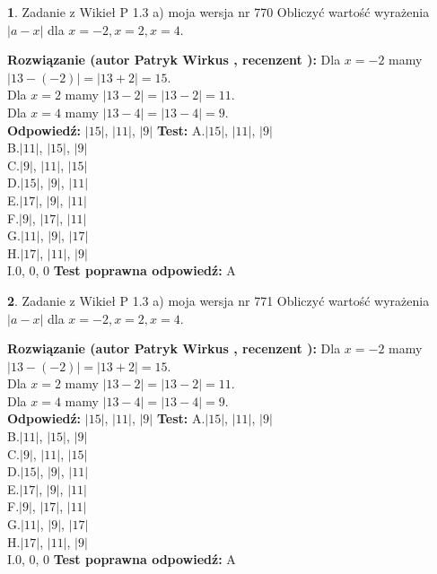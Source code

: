 \documentclass[12pt, a4paper]{article}
\theoremstyle{definition} %
\newtheorem{zad}{}
\newcommand{\zadStart}[1]{\begin{zad}#1\newline}
\newcommand{\zadStop}{\end{zad}}
\newcommand{\rozwStart}[2]{\noindent \textbf{Rozwiązanie (autor #1 , recenzent #2): }\newline}
\newcommand{\rozwStop}{\newline}
\newcommand{\odpStart}{\noindent \textbf{Odpowiedź:}\newline}
\newcommand{\odpStop}{\newline}
\newcommand{\testStart}{\noindent \textbf{Test:}\newline}
\newcommand{\testStop}{\newline}
\newcommand{\kluczStart}{\noindent \textbf{Test poprawna odpowiedź:}\newline}
\newcommand{\kluczStop}{\newline}
\begin{document}
\zadStart{Zadanie z Wikieł P 1.3 a) moja wersja nr 770}
Obliczyć wartość wyrażenia $|a - x|$ dla $x=-2,x=2,x=4$.
\zadStop
\rozwStart{Patryk Wirkus}{}
Dla $x = -2$ mamy $|13 - (-2)| = |13 + 2| = 15$.\\
Dla $x = 2$ mamy $|13 - 2| = |13 - 2| = 11$.\\
Dla $x = 4$ mamy $|13 - 4| = |13 - 4| = 9$.\\
\rozwStop
\odpStart
$|15|$, $|11|$, $|9|$
\odpStop
\testStart
A.$|15|$, $|11|$, $|9|$\\
B.$|11|$, $|15|$, $|9|$\\
C.$|9|$, $|11|$, $|15|$\\
D.$|15|$, $|9|$, $|11|$\\
E.$|17|$, $|9|$, $|11|$\\
F.$|9|$, $|17|$, $|11|$\\
G.$|11|$, $|9|$, $|17|$\\
H.$|17|$, $|11|$, $|9|$\\
I.$0$, $0$, $0$
\testStop
\kluczStart
A
\kluczStop



\zadStart{Zadanie z Wikieł P 1.3 a) moja wersja nr 771}
Obliczyć wartość wyrażenia $|a - x|$ dla $x=-2,x=2,x=4$.
\zadStop
\rozwStart{Patryk Wirkus}{}
Dla $x = -2$ mamy $|13 - (-2)| = |13 + 2| = 15$.\\
Dla $x = 2$ mamy $|13 - 2| = |13 - 2| = 11$.\\
Dla $x = 4$ mamy $|13 - 4| = |13 - 4| = 9$.\\
\rozwStop
\odpStart
$|15|$, $|11|$, $|9|$
\odpStop
\testStart
A.$|15|$, $|11|$, $|9|$\\
B.$|11|$, $|15|$, $|9|$\\
C.$|9|$, $|11|$, $|15|$\\
D.$|15|$, $|9|$, $|11|$\\
E.$|17|$, $|9|$, $|11|$\\
F.$|9|$, $|17|$, $|11|$\\
G.$|11|$, $|9|$, $|17|$\\
H.$|17|$, $|11|$, $|9|$\\
I.$0$, $0$, $0$
\testStop
\kluczStart
A
\kluczStop
\end{document}

